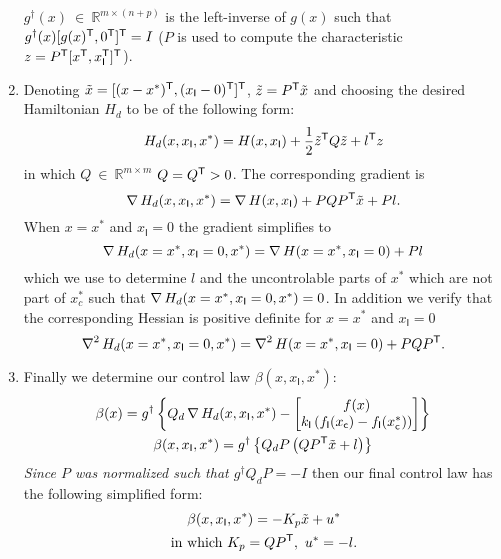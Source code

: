 \begin{enumerate}
  $g^{\dagger}(x) \ \in\
  \mathbb{R}^{m \times (n+p)}$ is the left-inverse of $g(x)$ such that
  $g^{\dagger}(x)[g(x)^{\mathsf{T}},0^{\mathsf{T}}]^{\mathsf{T}}=I$ ($P$ is used to compute the characteristic $z
  = P^{\mathsf{T}} [x^{\mathsf{T}},x_{\mathsf{I}}^{\mathsf{T}}]^{\mathsf{T}}$).
\item Denoting $\tilde{x}=[(x-x^*)^{\mathsf{T}},(x_{\mathsf{I}}-0)^{\mathsf{T}}]^{\mathsf{T}}$,
  $\tilde{z}=P^{\mathsf{T}} \tilde{x}$ and choosing the desired Hamiltonian $H_d$ 
  to be of the following form:
\begin{equation*}
H_d(x,x_{\mathsf{I}},x^*)=H(x,x_{\mathsf{I}}) + \frac{1}{2} \tilde{z}^{\mathsf{T}} Q
\tilde{z} + l^{\mathsf{T}} z 
\end{equation*}
in which $Q\ \in\ \mathbb{R}^{m \times m}$ $Q=Q^{\mathsf{T}} > 0$.  The corresponding gradient is 
\begin{equation*}
\operatorname{\nabla} H_d (x,x_{\mathsf{I}},x^*)=\operatorname{\nabla} H(x,x_{\mathsf{I}}) + PQP^{\mathsf{T}} \tilde{x} +
P l.
\end{equation*}
When $x=x^*$ and $x_{\mathsf{I}}=0$ the gradient simplifies to
\begin{equation*}
\operatorname{\nabla} H_d (x=x^*,x_{\mathsf{I}}=0,x^*)=\operatorname{\nabla} H(x=x^*,x_{\mathsf{I}}=0)
+ P l
\end{equation*}
which we use to determine $l$ and the uncontrolable parts of $x^*$
which are not part of $x^*_c$ such that $\operatorname{\nabla} H_d
(x=x^*,x_{\mathsf{I}}=0,x^*)=0$.  In addition we verify that the
corresponding Hessian is positive definite for $x=x^*$  and
$x_{\mathsf{I}}=0$
\begin{equation*}
\operatorname{\operatorname{\nabla}^2} H_d (x=x^*,x_{\mathsf{I}}=0,x^*)=\operatorname{\operatorname{\nabla}^2} H(x=x^*,x_{\mathsf{I}}=0)+P Q P^{\mathsf{T}}.
\end{equation*}
\item Finally we determine our control law $\beta(x,x_{\mathsf{I}},x^*)$:
\begin{gather*}
\beta(x)=g^{\dagger} \left \{ Q_d \operatorname{\nabla} H_d (x,x_{\mathsf{I}},x^*) -  \begin{bmatrix} f(x)\\ k_{\mathsf{I}}\left ( f_{\mathsf{I}} (x_{\mathsf{c}}) -
  f_{\mathsf{I}} (x_{\mathsf{c}}^*) \right ) \end{bmatrix} \right \} \\
\beta(x,x_{\mathsf{I}},x^*)=g^{\dagger} \left \{ Q_d P \left ( QP^{\mathsf{T}} \tilde{x} +
 l \right )  \right \}
\end{gather*}
{\em Since $P$ was normalized such that $g^{\dagger}Q_dP=-I$} then our
  final control law has the following simplified form:
\begin{gather*}
\beta(x,x_{\mathsf{I}},x^*)=-K_p \tilde{x} + u^*\\
\text{in which } K_p = QP^{\mathsf{T}},\ u^* = -l.
\end{gather*}
\end{enumerate}
